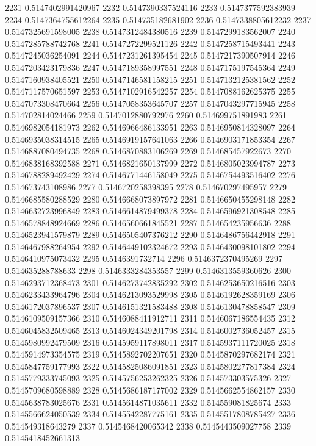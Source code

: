 2231 0.5147402991420967
2232 0.5147390337524116
2233 0.5147377592383939
2234 0.5147364755612264
2235 0.514735182681902
2236 0.5147338805612232
2237 0.5147325691598005
2238 0.5147312484380516
2239 0.5147299183562007
2240 0.5147285788742768
2241 0.5147272299521126
2242 0.5147258715493441
2243 0.5147245036254091
2244 0.5147231261395454
2245 0.5147217390507914
2246 0.5147203423179836
2247 0.5147189358997551
2248 0.5147175197545364
2249 0.5147160938405521
2250 0.5147146581158215
2251 0.5147132125381562
2252 0.5147117570651597
2253 0.5147102916542257
2254 0.5147088162625375
2255 0.5147073308470664
2256 0.5147058353645707
2257 0.5147043297715945
2258 0.514702814024466
2259 0.5147012880792976
2260 0.514699751891983
2261 0.5146982054181973
2262 0.5146966486133951
2263 0.5146950814328097
2264 0.5146935038314515
2265 0.5146919157641063
2266 0.5146903171853354
2267 0.5146887080494735
2268 0.5146870883106269
2269 0.514685457922673
2270 0.5146838168392588
2271 0.5146821650137999
2272 0.5146805023994787
2273 0.5146788289492429
2274 0.5146771446158049
2275 0.5146754493516402
2276 0.514673743108986
2277 0.5146720258398395
2278 0.514670297495957
2279 0.5146685580288529
2280 0.5146668073897972
2281 0.5146650455298148
2282 0.5146632723996849
2283 0.5146614879499378
2284 0.5146596921308548
2285 0.5146578848924669
2286 0.5146560661845521
2287 0.514654235956636
2288 0.5146523941579879
2289 0.5146505407376212
2290 0.5146486756442918
2291 0.5146467988264954
2292 0.5146449102324672
2293 0.5146430098101802
2294 0.5146410975073432
2295 0.5146391732714
2296 0.5146372370495269
2297 0.514635288788633
2298 0.5146333284353557
2299 0.5146313559360626
2300 0.5146293712368473
2301 0.5146273742835292
2302 0.5146253650216516
2303 0.5146233433964796
2304 0.5146213093529998
2305 0.5146192628359169
2306 0.5146172037896537
2307 0.5146151321583488
2308 0.5146130478858547
2309 0.5146109509157366
2310 0.5146088411912711
2311 0.5146067186554435
2312 0.5146045832509465
2313 0.5146024349201798
2314 0.5146002736052457
2315 0.5145980992479509
2316 0.5145959117898011
2317 0.5145937111720025
2318 0.5145914973354575
2319 0.5145892702207651
2320 0.5145870297682174
2321 0.5145847759177993
2322 0.5145825086091851
2323 0.5145802277817384
2324 0.5145779333745093
2325 0.5145756253262325
2326 0.514573303575326
2327 0.5145709680598889
2328 0.5145686187177002
2329 0.5145662554862157
2330 0.5145638783025676
2331 0.5145614871035611
2332 0.514559081825674
2333 0.5145566624050539
2334 0.5145542287775161
2335 0.5145517808785427
2336 0.514549318643279
2337 0.5145468420065342
2338 0.5145443509027758
2339 0.5145418452661313
